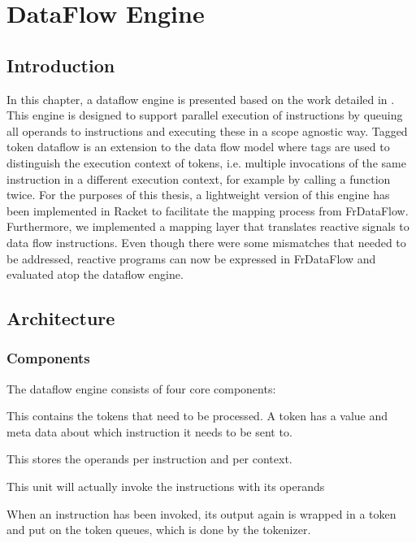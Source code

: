 \chapter{DataFlow Engine}

\section{Introduction}

In this chapter, a dataflow engine is presented based on the work detailed in \citet{saey_extensible_2017}.
This engine is designed to support parallel execution of instructions by queuing all operands to instructions and executing these in a scope agnostic way.
Tagged token dataflow is an extension to the data flow model where tags are used to distinguish the execution context of tokens, i.e. multiple invocations of the same instruction in a different execution context, for example by calling a function twice.
For the purposes of this thesis, a lightweight version of this engine has been implemented in Racket to facilitate the mapping process from FrDataFlow. Furthermore, we implemented a mapping layer that translates reactive signals to data flow instructions. Even though there were some mismatches that needed to be addressed, reactive programs can now be expressed in FrDataFlow and evaluated atop the dataflow engine. 

\newpage
\section{Architecture}

\subsection{Components}

The dataflow engine consists of four core components:

\begin{description}[style=nextline]
	\item[The token queue] This contains the tokens that need to be processed. A token has a value and meta data about which instruction it needs to be sent to. 
	\item[The matching memory] This stores the operands per instruction and per context.
	\item[The execution unit] This unit will actually invoke the instructions with its operands
	\item[The tokenizer] When an instruction has been invoked, its output again is wrapped in a token and put on the token queues, which is done by the tokenizer.
\end{description}

